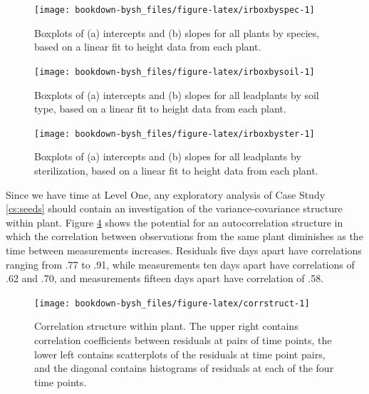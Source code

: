 \documentclass[
]{krantz}
\begin{document}
\begin{figure}

{\centering \texttt{[image: bookdown-bysh\_files/figure-latex/irboxbyspec-1]} 

}

\caption{Boxplots of (a) intercepts and (b) slopes for all plants by species, based on a linear fit to height data from each plant.}\label{fig:irboxbyspec}
\end{figure}

\begin{figure}

{\centering \texttt{[image: bookdown-bysh\_files/figure-latex/irboxbysoil-1]} 

}

\caption{Boxplots of (a) intercepts and (b) slopes for all leadplants by soil type, based on a linear fit to height data from each plant.}\label{fig:irboxbysoil}
\end{figure}

\begin{figure}

{\centering \texttt{[image: bookdown-bysh\_files/figure-latex/irboxbyster-1]} 

}

\caption{Boxplots of (a) intercepts and (b) slopes for all leadplants by sterilization, based on a linear fit to height data from each plant.}\label{fig:irboxbyster}
\end{figure}

Since we have time at Level One, any exploratory analysis of Case Study \ref{cs:seeds} should contain an investigation of the variance-covariance structure within plant. Figure \ref{fig:corrstruct} shows the potential for an autocorrelation structure in which the correlation between observations from the same plant diminishes as the time between measurements increases. Residuals five days apart have correlations ranging from .77 to .91, while measurements ten days apart have correlations of .62 and .70, and measurements fifteen days apart have correlation of .58.

\begin{figure}

{\centering \texttt{[image: bookdown-bysh\_files/figure-latex/corrstruct-1]} 

}

\caption{Correlation structure within plant.  The upper right contains correlation coefficients between residuals at pairs of time points, the lower left contains scatterplots of the residuals at time point pairs, and the diagonal contains histograms of residuals at each of the four time points.}\label{fig:corrstruct}
\end{figure}
\end{document}
